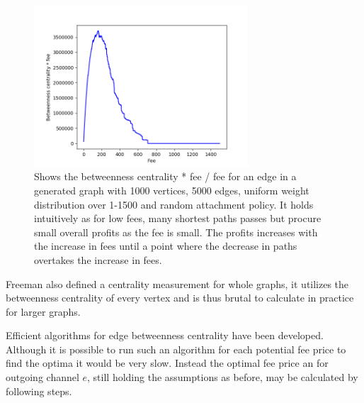 \begin{figure}[!htb]

	\centering
	\includegraphics[width=8cm]{images/fee_curve.png}
	\caption{ Shows the betweenness centrality * fee / fee for an edge in a generated graph with 1000 vertices, 5000 edges, uniform weight distribution over 1-1500 and random attachment policy. It holds intuitively as for low fees, many shortest paths passes but procure small overall profits as the fee is small. The profits increases with the increase in fees until a point where the decrease in paths overtakes the increase in fees.
	}
	\label{fig:fee_curve}

\end{figure}

Freeman also defined a centrality measurement for whole graphs, it utilizes the betweenness centrality of every vertex and is thus brutal to calculate in practice for larger graphs. 

Efficient algorithms for edge betweenness centrality have been developed\cite{brandes:betweenness:centrality:algorithm}. Although it is possible to run such an algorithm for each potential fee price to find the optima it would be very slow.
Instead the optimal fee price an for outgoing channel $e$, still holding the assumptions as before, may be calculated by following steps.

